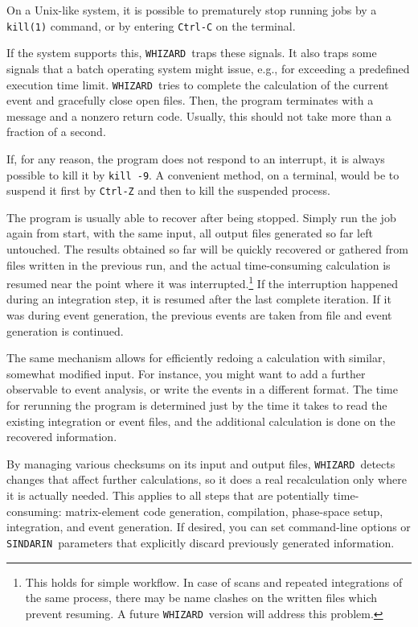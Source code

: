 \documentclass[12pt]{book}
\newcommand{\ttt}[1]{\texttt{#1}}
\newcommand{\whizard}{\texttt{WHIZARD}}
\newcommand{\sindarin}{\texttt{SINDARIN}}
\begin{document}
On a Unix-like system, it is possible to prematurely stop running jobs
by a \ttt{kill(1)} command, or by entering \ttt{Ctrl-C} on the
terminal.

If the system supports this, \whizard\ traps these signals.  It also
traps some signals that a batch operating system might issue, e.g.,
for exceeding a predefined execution time limit.  \whizard\ tries to
complete the calculation of the current event and gracefully close
open files.  Then, the program terminates with a message and a nonzero
return code.  Usually, this should not take more than a fraction of a
second.

If, for any reason, the program does not respond to an interrupt, it
is always possible to kill it by \ttt{kill -9}.  A convenient method,
on a terminal, would be to suspend it first by \ttt{Ctrl-Z} and then
to kill the suspended process.

The program is usually able to recover after being stopped.  Simply
run the job again from start, with the same input, all output files
generated so far left untouched.  The results obtained so far will be
quickly recovered or gathered from files written in the previous run,
and the actual time-consuming calculation is resumed near the point
where it was interrupted.\footnote{This holds for simple workflow.  In
  case of scans and repeated integrations of the same process, there
  may be name clashes on the written files which prevent resuming.  A
  future \whizard\ version will address this problem.}  If the
interruption happened during an integration step, it is resumed after
the last complete iteration.  If it was during event generation, the
previous events are taken from file and event generation is continued.

The same mechanism allows for efficiently redoing a calculation with
similar, somewhat modified input.  For instance, you might want to add
a further observable to event analysis, or write the events in a
different format.  The time for rerunning the program is determined
just by the time it takes to read the existing integration or event
files, and the additional calculation is done on the recovered
information.

By managing various checksums on its input and output files, \whizard\
detects changes that affect further calculations, so it does a
real recalculation only where it is actually needed.  This applies to
all steps that are potentially time-consuming: matrix-element code
generation, compilation, phase-space setup, integration, and event
generation.  If desired, you can set command-line options or
\sindarin\ parameters that explicitly discard previously generated
information.
\end{document}
